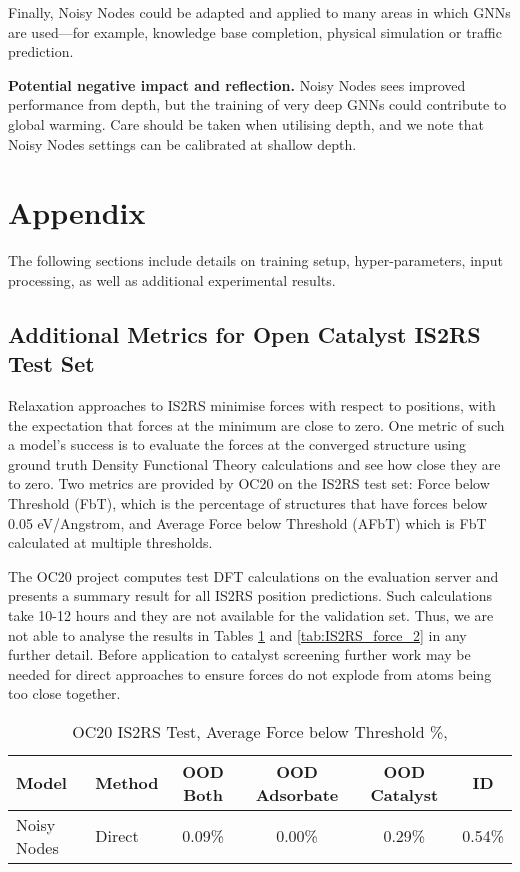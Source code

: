 \documentclass{article} \usepackage{iclr2022_conference,times}
\begin{document}
Finally, Noisy Nodes could be adapted and applied to many areas in which GNNs are used---for example, knowledge base completion, physical simulation or traffic prediction.

\textbf{Potential negative impact and reflection.} Noisy Nodes sees improved performance from depth, but the training of very deep GNNs could contribute to global warming. Care should be taken when utilising depth, and we note that Noisy Nodes settings can be calibrated at shallow depth.



\appendix
\section{Appendix}

The following sections include details on training setup, hyper-parameters, input processing, as well as additional experimental results.

\subsection{Additional Metrics for Open Catalyst IS2RS Test Set}

Relaxation approaches to IS2RS minimise forces with respect to positions, with the expectation that forces at the minimum are close to zero. One metric of such a model's success is to evaluate the forces at the converged structure using ground truth Density Functional Theory calculations and see how close they are to zero. Two metrics are provided by OC20 \citep{Chanussot2020TheOC} on the IS2RS test set: Force below Threshold (FbT), which is the percentage of structures that have forces below 0.05 eV/Angstrom, and Average Force below Threshold (AFbT) which is FbT calculated at multiple thresholds.

The OC20 project computes test DFT calculations on the evaluation server and presents a summary result for all IS2RS position predictions. Such calculations take 10-12 hours and they are not available for the validation set. Thus, we are not able to analyse the results in Tables \ref{tab:IS2RS_force_1} and \ref{tab:IS2RS_force_2}  in any further detail. Before application to catalyst screening further work may be needed for direct approaches to ensure forces do not explode from atoms being too close together.

\begin{table}
\caption{OC20 IS2RS Test, Average Force below Threshold \%, }
\label{tab:IS2RS_force_1}
\centering
\begin{tabular}{llcccc}
  \toprule
  Model & Method & OOD Both & OOD Adsorbate & OOD Catalyst & ID \\
  \midrule
  Noisy Nodes & Direct & 0.09\% & 0.00\% & 0.29\% & 0.54\% \\
  \bottomrule
\end{tabular}
\end{table}
\end{document}
